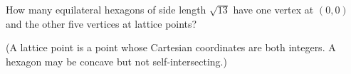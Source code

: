 How many equilateral hexagons of side length $\sqrt{13}$ have one vertex at $(0,0)$ and the other five vertices at lattice points?

(A lattice point is a point whose Cartesian coordinates are both integers. A hexagon may be concave but not self-intersecting.)